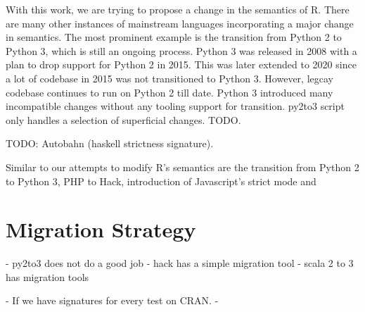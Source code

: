 \documentclass[screen,acmsmall]{acmart}
\begin{document}
With this work, we are trying to propose a change in the semantics of R. There
are many other instances of mainstream languages incorporating a major change in
semantics. The most prominent example is the transition from Python 2 to Python
3, which is still an ongoing process. Python 3 was released in 2008 with a
plan\cite{pysunset} to drop support for Python 2 in 2015. This was later
extended to 2020 since a lot of codebase in 2015 was not transitioned to Python
3. However, legcay codebase continues to run on Python 2 till date. Python 3
introduced many incompatible changes without any tooling support for transition.
py2to3 script only handles a selection of superficial changes. TODO.

TODO: Autobahn (haskell strictness signature).

Similar to our attempts to modify R's semantics are the transition from Python 2
to Python 3, PHP to Hack, introduction of Javascript's strict mode and 



\section{Migration Strategy}
- py2to3 does not do a good job
- hack has a simple migration tool
- scala 2 to 3 has migration tools

- If we have signatures for every test on CRAN.
- 



\end{document}
